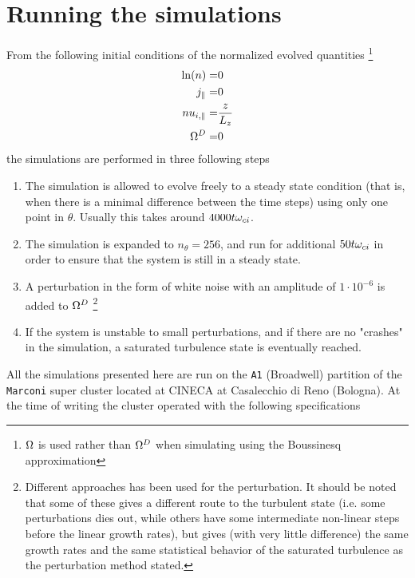 \section{Running the simulations}
\label{sec:initRun}
%
From the following initial conditions of the normalized evolved quantities%
%
\footnote{$\Omega$ is used rather than $\Omega^D$ when simulating using the Boussinesq approximation}%
%
\begin{align*}
    \ln(n)    =& 0\\
    j_\|      =& 0\\
    nu_{i,\|} =& \frac{z}{L_z}\\
    \Omega^D     =& 0
\end{align*}
%
the simulations are performed in three following steps
%
\begin{enumerate}[noitemsep]
    \item The simulation is allowed to evolve freely to a steady state condition (that is, when there is a minimal difference between the time steps) using only one point in $\theta$.
        Usually this takes around $4000t\omega_{ci}$.
    \item The simulation is expanded to $n_\theta = 256$, and run for additional $50t\omega_{ci}$ in order to ensure that the system is still in a steady state.
    \item A perturbation in the form of white noise with an amplitude of $1\cdot10^{-6}$ is added to $\Omega^D$%
        \footnote{Different approaches has been used for the perturbation.
            It should be noted that some of these gives a different route to the turbulent state (i.e. some perturbations dies out, while others have some intermediate non-linear steps before the linear growth rates), but gives (with very little difference) the same growth rates and the same statistical behavior of the saturated turbulence as the perturbation method stated.}%
    \item If the system is unstable to small perturbations, and if there are no "crashes" in the simulation, a saturated turbulence state is eventually reached.
\end{enumerate}
%
All the simulations presented here are run on the \texttt{A1} (Broadwell) partition of the \texttt{Marconi} super cluster located at CINECA at Casalecchio di Reno (Bologna).
At the time of writing the cluster operated with the following specifications \cite{Marconi2016Web}
%
